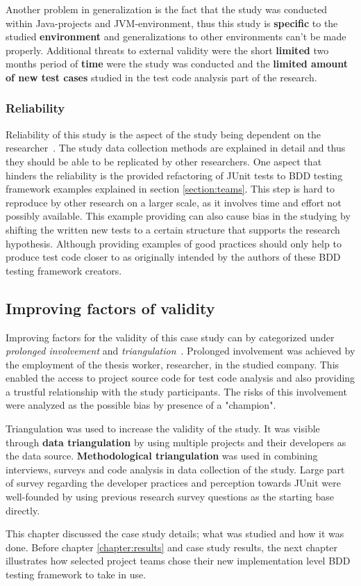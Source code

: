 Another problem in generalization is the fact that the study was conducted within Java-projects and JVM-environment, thus this
study is \textbf{specific} to the studied \textbf{environment} and generalizations to other environments can't be made properly.
Additional threats to external validity were the short
\textbf{limited} two months period of \textbf{time} were the study was conducted and the \textbf{limited amount of new test cases} studied
in the test code analysis part of the research.

\subsubsection{Reliability}
Reliability of this study is the aspect of the study being dependent on the researcher~\cite{runeson2012case}. The study
data collection methods are explained in detail and thus they should be able to be replicated by other researchers. One
aspect that hinders the reliability is the provided refactoring of JUnit tests to BDD testing framework examples explained
in section \ref{section:teams}. This step is hard to reproduce by other research on a larger scale, as it involves time and effort not
possibly available. This example providing can also cause bias in the studying by
shifting the written new tests to a certain structure that supports the research hypothesis. Although providing examples
of good practices should only help to produce test code closer to as originally intended by the authors of these BDD testing framework creators.

\subsection{Improving factors of validity}
Improving factors for the validity of this case study can by categorized under \textit{prolonged involvement} and \textit{triangulation}~\cite{runeson2012case}.
Prolonged involvement was achieved by the employment of the thesis worker, researcher, in the studied company. This enabled the access
to project source code for test code analysis and also providing a trustful relationship with the study participants. The
risks of this involvement were analyzed as the possible bias by presence of a "champion".

Triangulation was used to increase the validity of the study. It was visible through \textbf{data triangulation} by using
multiple projects and their developers as the data source. \textbf{Methodological triangulation} was used in combining
interviews, surveys and code analysis in data collection of the study. Large part of survey regarding the developer practices and perception
towards JUnit were well-founded by using previous research survey questions as the starting base directly.

This chapter discussed the case study details; what was studied and how it was done. Before chapter \ref{chapter:results} and case study results,
the next chapter illustrates how selected project teams chose their new implementation level BDD testing framework to take in use.





